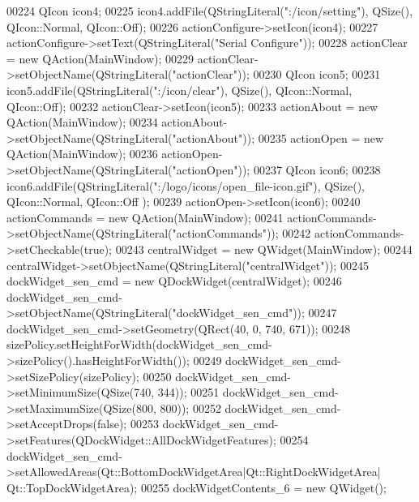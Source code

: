\begin{DoxyCode}
00224         QIcon icon4;
00225         icon4.addFile(QStringLiteral(\textcolor{stringliteral}{":/icon/setting"}), QSize(), QIcon::Normal, QIcon::Off);
00226         actionConfigure->setIcon(icon4);
00227         actionConfigure->setText(QStringLiteral(\textcolor{stringliteral}{"Serial Configure"}));
00228         actionClear = \textcolor{keyword}{new} QAction(MainWindow);
00229         actionClear->setObjectName(QStringLiteral(\textcolor{stringliteral}{"actionClear"}));
00230         QIcon icon5;
00231         icon5.addFile(QStringLiteral(\textcolor{stringliteral}{":/icon/clear"}), QSize(), QIcon::Normal, QIcon::Off);
00232         actionClear->setIcon(icon5);
00233         actionAbout = \textcolor{keyword}{new} QAction(MainWindow);
00234         actionAbout->setObjectName(QStringLiteral(\textcolor{stringliteral}{"actionAbout"}));
00235         actionOpen = \textcolor{keyword}{new} QAction(MainWindow);
00236         actionOpen->setObjectName(QStringLiteral(\textcolor{stringliteral}{"actionOpen"}));
00237         QIcon icon6;
00238         icon6.addFile(QStringLiteral(\textcolor{stringliteral}{":/logo/icons/open\_file-icon.gif"}), QSize(), QIcon::Normal, QIcon::Off
      );
00239         actionOpen->setIcon(icon6);
00240         actionCommands = \textcolor{keyword}{new} QAction(MainWindow);
00241         actionCommands->setObjectName(QStringLiteral(\textcolor{stringliteral}{"actionCommands"}));
00242         actionCommands->setCheckable(\textcolor{keyword}{true});
00243         centralWidget = \textcolor{keyword}{new} QWidget(MainWindow);
00244         centralWidget->setObjectName(QStringLiteral(\textcolor{stringliteral}{"centralWidget"}));
00245         dockWidget\_sen\_cmd = \textcolor{keyword}{new} QDockWidget(centralWidget);
00246         dockWidget\_sen\_cmd->setObjectName(QStringLiteral(\textcolor{stringliteral}{"dockWidget\_sen\_cmd"}));
00247         dockWidget\_sen\_cmd->setGeometry(QRect(40, 0, 740, 671));
00248         sizePolicy.setHeightForWidth(dockWidget\_sen\_cmd->sizePolicy().hasHeightForWidth());
00249         dockWidget\_sen\_cmd->setSizePolicy(sizePolicy);
00250         dockWidget\_sen\_cmd->setMinimumSize(QSize(740, 344));
00251         dockWidget\_sen\_cmd->setMaximumSize(QSize(800, 800));
00252         dockWidget\_sen\_cmd->setAcceptDrops(\textcolor{keyword}{false});
00253         dockWidget\_sen\_cmd->setFeatures(QDockWidget::AllDockWidgetFeatures);
00254         dockWidget\_sen\_cmd->setAllowedAreas(Qt::BottomDockWidgetArea|Qt::RightDockWidgetArea|
      Qt::TopDockWidgetArea);
00255         dockWidgetContents\_6 = \textcolor{keyword}{new} QWidget();

\end{DoxyCode}
